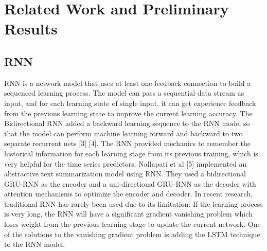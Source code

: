 \documentclass[conference]{IEEEtran}
\begin{document}
\section{Related Work and Preliminary Results}
\subsection{RNN}
RNN is a network model that uses at least one feedback connection to build a sequenced learning process. The model can pass a sequential data stream as input, and for each learning state of single input, it can get experience feedback from the previous learning state to improve the current learning accuracy. The Bidirectional RNN added a backward learning sequence to the RNN model so that the model can perform machine learning forward and backward to two separate recurrent nets [3] [4]. The RNN provided mechanics to remember the historical information for each learning stage from its previous training, which is very helpful for the time series predictors. Nallapati et al [5] implemented an abstractive text summarization model using RNN. They used a bidirectional GRU-RNN as the encoder and a uni-directional GRU-RNN as the decoder with attention mechanisms to optimize the encoder and decoder. In recent research, traditional RNN has rarely been used due to its limitation: If the learning process is very long, the RNN will have a significant gradient vanishing problem which loses weight from the previous learning stage to update the current network. One of the solutions to the vanishing gradient problem is adding the LSTM technique to the RNN model. 
\end{document}
